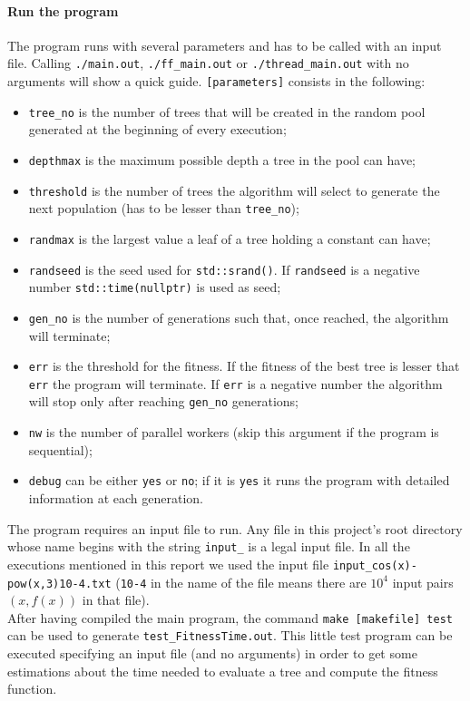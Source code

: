 \documentclass[10pt]{article}
\numberwithin{equation}{section}
\begin{document}
\begin{itemize}
\paragraph{Run the program}
The program runs with several parameters and has to be called with an input file. Calling \verb|./main.out|, \verb|./ff_main.out| or \verb|./thread_main.out| with no arguments will show a quick guide. \verb|[parameters]| consists in the following: 
\begin{itemize}
	\item \verb|tree_no| is the number of trees that will be created in the random pool generated at the beginning of every execution;
	\item \verb|depthmax| is the maximum possible depth a tree in the pool can have;
	\item \verb|threshold| is the number of trees the algorithm will select to generate the next population (has to be lesser than \verb|tree_no|);
	\item \verb|randmax| is the largest value a leaf of a tree holding a constant can have;
	\item \verb|randseed| is the seed used for \verb|std::srand()|. If \verb|randseed| is a negative number \verb|std::time(nullptr)| is used as seed;
	\item \verb|gen_no| is the number of generations such that, once reached, the algorithm will terminate;
	\item \verb|err| is the threshold for the fitness. If the fitness of the best tree is lesser that \verb|err| the program will terminate. If \verb|err| is a negative number the algorithm will stop only after reaching \verb|gen_no| generations;
	\item \verb|nw| is the number of parallel workers (skip this argument if the program is sequential);
	\item \verb|debug| can be either \verb|yes| or \verb|no|; if it is \verb|yes| it runs the program with detailed information at each generation.	   
\end{itemize}
The program requires an input file to run. Any file in this project's root directory whose name begins with the string \verb|input_| is a legal input file. In all the executions mentioned in this report we used the input file \verb|input_cos(x)-pow(x,3)10-4.txt| (\verb|10-4| in the name of the file means there are $10^4$ input pairs $(x,f(x))$ in that file).\\
After having compiled the main program, the command \verb|make [makefile] test| can be used to generate \verb|test_FitnessTime.out|. This little test program can be executed specifying an input file (and no arguments) in order to get some estimations about the time needed to evaluate a tree and compute the fitness function.
\end{itemize}
\end{document}
